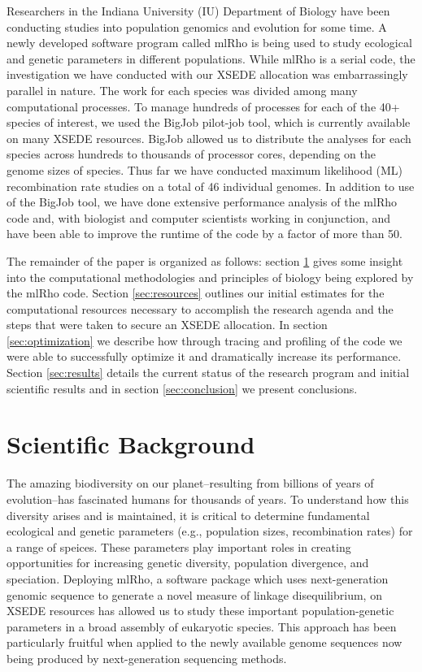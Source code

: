 \documentclass{sig-alternate}
\begin{document}
Researchers in the Indiana University (IU) Department of Biology have been conducting studies into population
genomics and evolution for some time. A newly developed software program called mlRho \cite{MEC:MEC4482} is
being used to study ecological and genetic parameters in different populations. While
mlRho is a serial code, the investigation we have conducted with our XSEDE allocation was
embarrassingly parallel in nature. The work for each species was divided among many
computational processes. To manage hundreds of processes for each of the 40+ species of interest, we used the
BigJob pilot-job tool, which is currently available on many XSEDE resources. BigJob allowed us to distribute
the analyses for each species across hundreds to thousands of processor cores, depending on the genome sizes
of species. Thus far we have conducted maximum likelihood (ML) recombination rate studies on a total of 46 individual
genomes. In addition to use of the BigJob tool, we have done extensive performance analysis of the
mlRho code and, with biologist and computer scientists working in conjunction, and have been able to improve the
runtime of the code by a factor of more than 50.

The remainder of the paper is organized as follows: section \ref{sec:background} gives some insight into the
computational methodologies and principles of biology being explored by the mlRho code. Section
\ref{sec:resources} outlines our initial estimates for the computational resources necessary to accomplish the
research agenda and the steps that were taken to secure an XSEDE allocation. In section \ref{sec:optimization}
we describe how through tracing and profiling of the code we were able to successfully optimize it and
dramatically increase its performance. Section \ref{sec:results} details the current status of the research
program and initial scientific results and in section \ref{sec:conclusion} we present conclusions.


\section{Scientific Background}\label{sec:background}
The amazing biodiversity on our planet--resulting from billions of years of evolution--has fascinated humans for thousands of years. To understand how this diversity arises and is maintained, it is critical to determine fundamental ecological and genetic parameters (e.g., population sizes, recombination rates) for a range of speices. These parameters play important roles in creating opportunities for increasing genetic diversity, population divergence, and speciation. Deploying mlRho, a software package which uses next-generation genomic sequence to generate a novel measure of linkage disequilibrium, on XSEDE resources has allowed us to study these important population-genetic parameters in a broad assembly of eukaryotic species. This approach has been particularly fruitful when applied to the newly available genome sequences now being produced by next-generation sequencing methods. 
\end{document}
